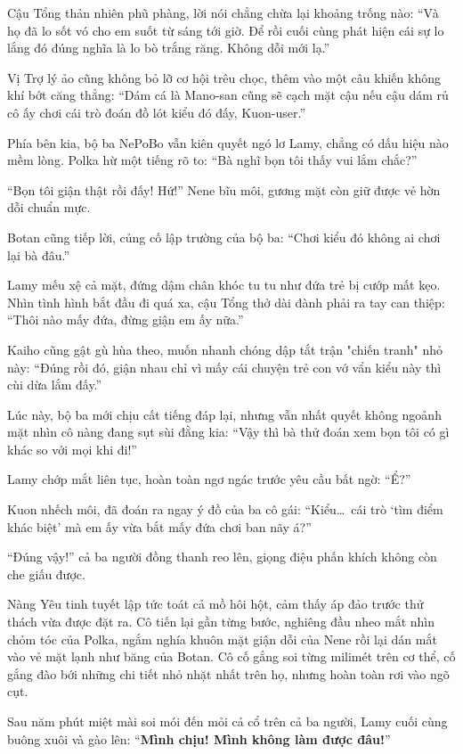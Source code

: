 \documentclass[../main.tex]{subfiles}
\begin{document}
Cậu Tổng thản nhiên phũ phàng, lời nói chẳng chừa lại khoảng trống nào: ``Và họ đã lo sốt vó cho em suốt từ sáng tới giờ. Để rồi cuối cùng phát hiện cái sự lo lắng đó đúng nghĩa là lo bò trắng răng. Không dỗi mới lạ.''

Vị Trợ lý ảo cũng không bỏ lỡ cơ hội trêu chọc, thêm vào một câu khiến không khí bớt căng thẳng: ``Dám cá là Mano-san cũng sẽ cạch mặt cậu nếu cậu dám rủ cô ấy chơi cái trò đoán đồ lót kiểu đó đấy, Kuon-user.''

Phía bên kia, bộ ba NePoBo vẫn kiên quyết ngó lơ Lamy, chẳng có dấu hiệu nào mềm lòng. Polka hừ một tiếng rõ to: ``Bà nghĩ bọn tôi thấy vui lắm chắc?''

``Bọn tôi giận thật rồi đấy! Hứ!'' Nene bĩu môi, gương mặt còn giữ được vẻ hờn dỗi chuẩn mực.

Botan cũng tiếp lời, củng cố lập trường của bộ ba: ``Chơi kiểu đó không ai chơi lại bà đâu.''

Lamy mếu xệ cả mặt, đứng dậm chân khóc tu tu như đứa trẻ bị cướp mất kẹo. Nhìn tình hình bắt đầu đi quá xa, cậu Tổng thở dài đành phải ra tay can thiệp: ``Thôi nào mấy đứa, đừng giận em ấy nữa.''

Kaiho cũng gật gù hùa theo, muốn nhanh chóng dập tắt trận "chiến tranh" nhỏ này: ``Đúng rồi đó, giận nhau chỉ vì mấy cái chuyện trẻ con vớ vẩn kiểu này thì cùi dừa lắm đấy.''

Lúc này, bộ ba mới chịu cất tiếng đáp lại, nhưng vẫn nhất quyết không ngoảnh mặt nhìn cô nàng đang sụt sùi đằng kia: ``Vậy thì bà thử đoán xem bọn tôi có gì khác so với mọi khi đi!''

Lamy chớp mắt liên tục, hoàn toàn ngơ ngác trước yêu cầu bất ngờ: ``Ể?''

Kuon nhếch môi, đã đoán ra ngay ý đồ của ba cô gái: ``Kiểu\dots\ cái trò `tìm điểm khác biệt' mà em ấy vừa bắt mấy đứa chơi ban nãy á?''

``Đúng vậy!'' cả ba người đồng thanh reo lên, giọng điệu phấn khích không còn che giấu được.

Nàng Yêu tinh tuyết lập tức toát cả mồ hôi hột, cảm thấy áp đảo trước thử thách vừa được đặt ra. Cô tiến lại gần từng bước, nghiêng đầu nheo mắt nhìn chỏm tóc của Polka, ngắm nghía khuôn mặt giận dỗi của Nene rồi lại dán mắt vào vẻ mặt lạnh như băng của Botan. Cô cố gắng soi từng milimét trên cơ thể, cố gắng đào bới những chi tiết nhỏ nhặt nhất trên họ, nhưng hoàn toàn rơi vào ngõ cụt.

Sau năm phút miệt mài soi mói đến mỏi cả cổ trên cả ba người, Lamy cuối cùng buông xuôi và gào lên: ``\textbf{Mình chịu! Mình không làm được đâu!}''
\end{document}
